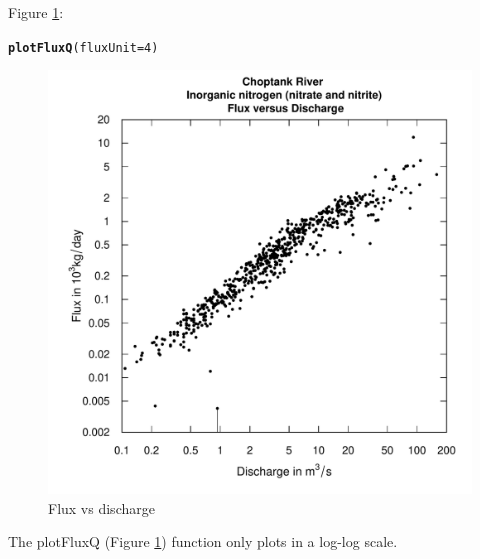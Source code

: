 \documentclass[a4paper,11pt]{article}\usepackage[]{graphicx}\usepackage[]{color}
\makeatletter
\newcommand{\hlnum}[1]{\textcolor[rgb]{0.686,0.059,0.569}{#1}}%
\newcommand{\hlstd}[1]{\textcolor[rgb]{0.345,0.345,0.345}{#1}}%
\newcommand{\hlkwc}[1]{\textcolor[rgb]{0.333,0.667,0.333}{#1}}%
\newcommand{\hlkwd}[1]{\textcolor[rgb]{0.737,0.353,0.396}{\textbf{#1}}}%
\newenvironment{kframe}{%
 \def\at@end@of@kframe{}%
 \ifinner\ifhmode%
  \def\at@end@of@kframe{\end{minipage}}%
  \begin{minipage}{\columnwidth}%
 \fi\fi%
 \def\FrameCommand##1{\hskip\@totalleftmargin \hskip-\fboxsep
 \colorbox{shadecolor}{##1}\hskip-\fboxsep
     \hskip-\linewidth \hskip-\@totalleftmargin \hskip\columnwidth}%
 \MakeFramed {\advance\hsize-\width
   \@totalleftmargin\z@ \linewidth\hsize
   \@setminipage}}%
 {\par\unskip\endMakeFramed%
 \at@end@of@kframe}
\newenvironment{knitrout}{}{} %
\makeatother
\begin{document}
Figure \ref{fig:plotFluxQ}:
\begin{knitrout}
\color{fgcolor}\begin{kframe}
\begin{alltt}
\hlkwd{plotFluxQ}\hlstd{(}\hlkwc{fluxUnit}\hlstd{=}\hlnum{4}\hlstd{)}
\end{alltt}
\end{kframe}\begin{figure}[]

\includegraphics[width=.5\linewidth,height=.5\linewidth]{figure/plotFluxQ} \caption[Flux vs discharge]{Flux vs discharge\label{fig:plotFluxQ}}
\end{figure}


\end{knitrout}


The plotFluxQ (Figure \ref{fig:plotFluxQ}) function only plots in a log-log scale.

\FloatBarrier
\end{document}
